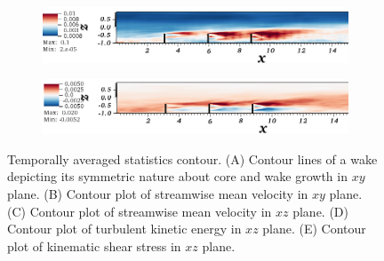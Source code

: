 \begin{figure}
\begin{subfigure}[t]{0.75\textwidth}
                \caption{}
                \label{fig:ss2b}
        \end{subfigure}
       \centering
        \begin{subfigure}[t]{0.75\textwidth}
                \includegraphics[width=\linewidth]{Figure/tke.png}
                \caption{}
                \label{fig:ss3}
        \end{subfigure}
       \centering
        \begin{subfigure}[t]{0.75\textwidth}
                \includegraphics[width=\linewidth]{Figure/uv_shear.png}
                \caption{}
                \label{fig:ss4}
        \end{subfigure}%
        \caption[Temporally Averaged Statistics Contours]{Temporally averaged statistics contour. (A) Contour lines of a wake depicting its symmetric nature about core and wake growth in $xy$ plane. (B) Contour plot of streamwise mean velocity in $xy$ plane. (C) Contour plot of streamwise mean velocity in $xz$ plane. (D) Contour plot of turbulent kinetic energy in $xz$ plane. (E) Contour plot of kinematic shear stress in $xz$ plane.} \label{fig:stress_contours}
\end{figure}

    
